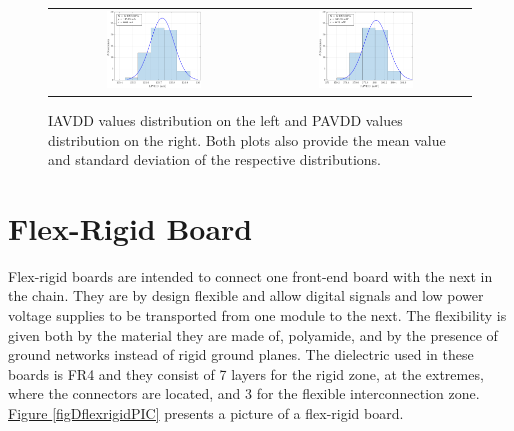 \begin{figure}[h!]
    \centering
    \begin{tabular}{cc}
        \includegraphics[width=0.475\textwidth]{Images/chap2/results/dummy/AIDD.pdf} & \includegraphics[width=0.475\textwidth]{Images/chap2/results/dummy/APDD.pdf}\\
    \end{tabular}
    \caption{IAVDD values distribution on the left and PAVDD values distribution on the right. Both plots also provide the mean value and standard deviation of the respective distributions.}
    \label{figDUMMYresults}
\end{figure}



\section{Flex-Rigid Board} \label{flexrigids}

Flex-rigid boards are intended to connect one front-end board with the next in the chain. They are by design flexible and allow digital signals and low power voltage supplies to be transported from one module to the next. The flexibility is given both by the material they are made of, polyamide, and by the presence of ground networks instead of rigid ground planes. The dielectric used in these boards is FR4 and they consist of 7 layers for the rigid zone, at the extremes, where the connectors are located, and 3 for the flexible interconnection zone. \hyperref[figDflexrigidPIC]{Figure \ref{figDflexrigidPIC}} presents a picture of a flex-rigid board.

